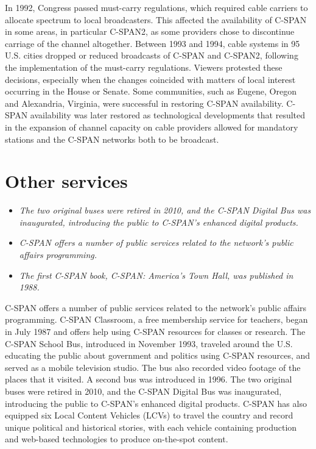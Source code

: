 In 1992, Congress passed must-carry regulations, which required cable
carriers to allocate spectrum to local broadcasters. This affected the
availability of C-SPAN in some areas, in particular C-SPAN2, as some
providers chose to discontinue carriage of the channel altogether.
Between 1993 and 1994, cable systems in 95 U.S. cities dropped or
reduced broadcasts of C-SPAN and C-SPAN2, following the implementation
of the must-carry regulations. Viewers protested these decisions,
especially when the changes coincided with matters of local interest
occurring in the House or Senate. Some communities, such as Eugene,
Oregon and Alexandria, Virginia, were successful in restoring C-SPAN
availability. C-SPAN availability was later restored as technological
developments that resulted in the expansion of channel capacity on cable
providers allowed for mandatory stations and the C-SPAN networks both to
be broadcast.

\section{Other services}\label{other-services}

\begin{itemize}
\item
  \emph{The two original buses were retired in 2010, and the C-SPAN
  Digital Bus was inaugurated, introducing the public to C-SPAN's
  enhanced digital products.}
\item
  \emph{C-SPAN offers a number of public services related to the
  network's public affairs programming.}
\item
  \emph{The first C-SPAN book, C-SPAN: America's Town Hall, was
  published in 1988.}
\end{itemize}

C-SPAN offers a number of public services related to the network's
public affairs programming. C-SPAN Classroom, a free membership service
for teachers, began in July 1987 and offers help using C-SPAN resources
for classes or research. The C-SPAN School Bus, introduced in November
1993, traveled around the U.S. educating the public about government and
politics using C-SPAN resources, and served as a mobile television
studio. The bus also recorded video footage of the places that it
visited. A second bus was introduced in 1996. The two original buses
were retired in 2010, and the C-SPAN Digital Bus was inaugurated,
introducing the public to C-SPAN's enhanced digital products. C-SPAN has
also equipped six Local Content Vehicles (LCVs) to travel the country
and record unique political and historical stories, with each vehicle
containing production and web-based technologies to produce on-the-spot
content.

